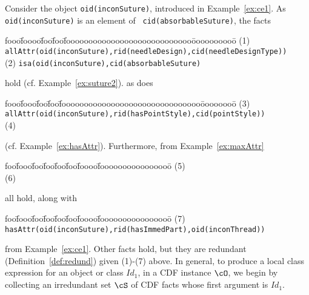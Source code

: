 \begin{example} \rm \label{ex:type1cc}
Consider the object {\tt oid(inconSuture)}, introduced in
Example~\ref{ex:ce1}.  As {\tt oid(inconSuture)} is an element of {\tt
cid(absorbableSuture)}, the facts
{\small
\begin{tabbing}
fooo\=foooo\=foo\=foo\=foooooooooooooooooooooooooooo\=oooooooooo\=\kill
\> (1) \> {\tt allAttr(oid(inconSuture),rid(needleDesign),cid(needleDesignType))} 
\\
\> (2) \> {\tt isa(oid(inconSuture),cid(absorbableSuture)} 
\end{tabbing}
}
\noindent
hold (cf. Example~\ref{ex:suture2}).  as does
{\small
\begin{tabbing}
fooo\=fooo\=foo\=foo\=fooooooooooooooooooooooooooooooo\=oooooooo\=\kill
\> (3) \> {\tt allAttr(oid(inconSuture),rid(hasPointStyle),cid(pointStyle)) } \\
\> (4) 
\end{tabbing}
}
\noindent
(cf. Example~\ref{ex:hasAttr}).  Furthermore, from Example~\ref{ex:maxAttr}
{\small
\begin{tabbing}
foo\=fooo\=foo\=foo\=foo\=foo\=foooo\=foooooooooooooooo\=\kill
\> (5)  \\
\> (6)  
\end{tabbing}
}
\noindent
all hold, along with 
{\small
\begin{tabbing}
foo\=fooo\=foo\=foo\=foo\=foo\=foooo\=foooooooooooooooo\=\kill
\> (7) \> {\tt hasAttr(oid(inconSuture),rid(hasImmedPart),oid(inconThread)) }
\end{tabbing}
}
\noindent
from Example~\ref{ex:ce1}.  Other facts hold, but they are redundant
(Definition~\ref{def:redund}) given (1)-(7) above.  In general, to
produce a local class expression for an object or class $Id_1$, in a CDF
instance $\cO$, we begin by collecting an irredundant set $\cS$ of CDF
facts whose first argument is $Id_1$.


\end{example}
